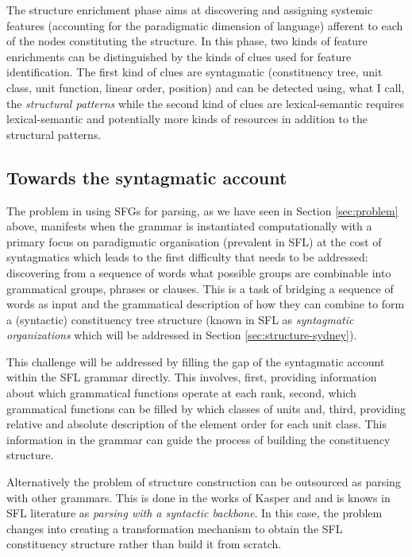 The structure enrichment phase aims at discovering and assigning systemic features (accounting for the paradigmatic dimension of language) afferent to each of the nodes constituting the structure. In this phase, two kinds of feature enrichments can be distinguished by the kinds of clues used for feature identification. The first kind of clues are syntagmatic (constituency tree, unit class, unit function, linear order, position) and can be detected using, what I call, the \textit{structural patterns} while the second kind of clues are lexical-semantic requires lexical-semantic and potentially more kinds of resources in addition to the structural patterns.

\subsection{Towards the syntagmatic account}
\label{sec:syntagmatic-account}
The problem in using SFGs for parsing, as we have seen in Section \ref{sec:problem} above, manifests when the grammar is instantiated computationally with a primary focus on paradigmatic organisation (prevalent in SFL) at the cost of syntagmatics which leads to the first difficulty that needs to be addressed: discovering from a sequence of words what possible groups are combinable into grammatical groups, phrases or clauses. This is a task of bridging a sequence of words as input and the grammatical description of how they can combine to form a (syntactic) constituency tree structure (known in SFL as \textit{syntagmatic organizations} which will be addressed in Section \ref{sec:structure-sydney}). 

This challenge will be addressed by filling the gap of the syntagmatic account within the SFL grammar directly. This involves, first, providing information about which grammatical functions operate at each rank, second, which grammatical functions can be filled by which classes of units and, third, providing relative and absolute description of the element order for each unit class. This information in the grammar can guide the process of building the constituency structure. 

Alternatively the problem of structure construction can be outsourced as parsing with other grammars. This is done in the works of Kasper \citet{Kasper1988} and \citet{Honnibal2004a, Honnibal2007} and is knows in SFL literature as \textit{parsing with a syntactic backbone}. In this case, the problem changes into creating a transformation mechanism to obtain the SFL constituency structure rather than build it from scratch. 

